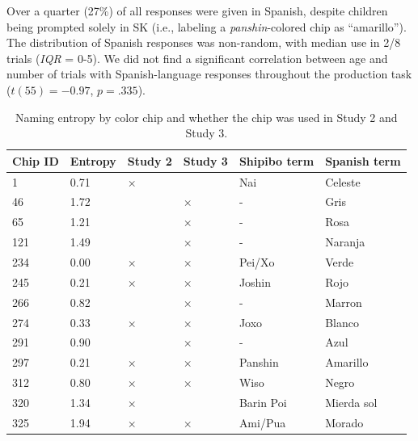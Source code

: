 \documentclass[
  english,
  ,apa7,floatsintext]{apa6}
\begin{document}
Over a quarter (27\%) of all responses were given in Spanish, despite children being prompted solely in SK (i.e., labeling a \emph{panshin}-colored chip as ``amarillo''). The distribution of Spanish responses was non-random, with median use in 2/8 trials (\emph{IQR} = 0-5). We did not find a significant correlation between age and number of trials with Spanish-language responses throughout the production task (\(t(55) = -0.97\), \(p = .335\)).

\begin{table}[tbp]

\begin{center}
\begin{threeparttable}

\caption{\label{tab:study1-entropy-table}Naming entropy by color chip and whether the chip was used in Study 2 and Study 3.}

\begin{tabular}{llllll}
\toprule
Chip ID & \multicolumn{1}{c}{Entropy} & \multicolumn{1}{c}{Study 2} & \multicolumn{1}{c}{Study 3} & \multicolumn{1}{c}{Shipibo term} & \multicolumn{1}{c}{Spanish term}\\
\midrule
1 & 0.71 & × &  & Nai & Celeste\\
46 & 1.72 &  & × & - & Gris\\
65 & 1.21 &  & × & - & Rosa\\
121 & 1.49 &  & × & - & Naranja\\
234 & 0.00 & × & × & Pei/Xo & Verde\\
245 & 0.21 & × & × & Joshin & Rojo\\
266 & 0.82 &  & × & - & Marron\\
274 & 0.33 & × & × & Joxo & Blanco\\
291 & 0.90 &  & × & - & Azul\\
297 & 0.21 & × & × & Panshin & Amarillo\\
312 & 0.80 & × & × & Wiso & Negro\\
320 & 1.34 & × &  & Barin Poi & Mierda sol\\
325 & 1.94 & × & × & Ami/Pua & Morado\\
\bottomrule
\end{tabular}

\end{threeparttable}
\end{center}

\end{table}
\end{document}
